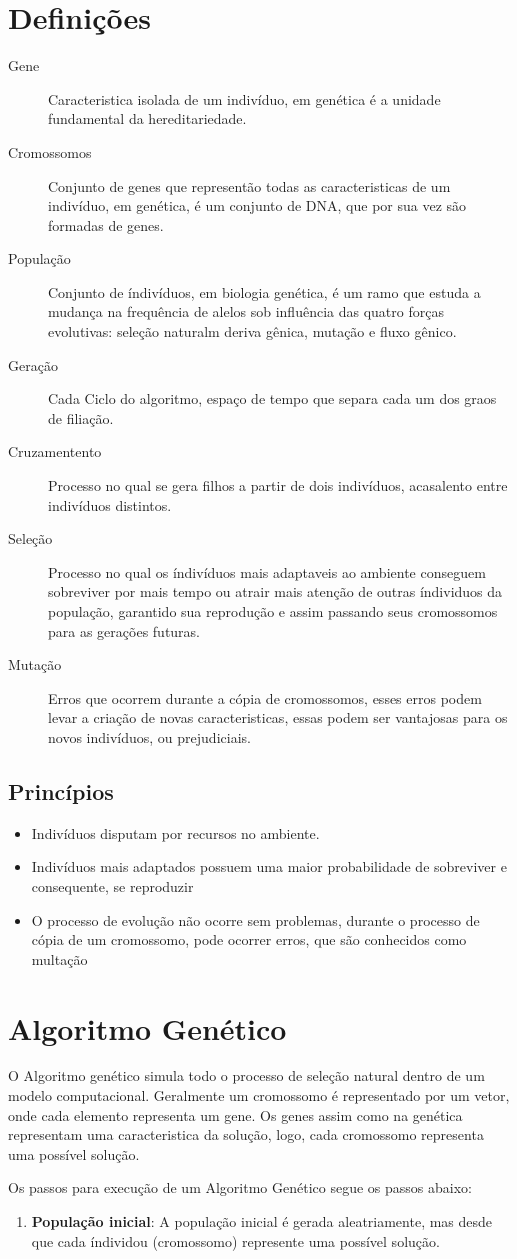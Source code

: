\documentclass[12pt,twoside,openright,a4paper,brazil]{article}
\begin{document}
	\section{Definições}
	\begin{description}
		\item[Gene] Caracteristica isolada de um indivíduo, em genética é a unidade fundamental da hereditariedade.
		\item[Cromossomos] Conjunto de genes que representão todas as caracteristicas de um indivíduo, em genética, é um conjunto de DNA, que por sua vez são formadas de genes.
		\item[População] Conjunto de índivíduos, em biologia genética, é um ramo que estuda a mudança na frequência de alelos sob influência das quatro forças evolutivas: seleção naturalm deriva gênica, mutação e fluxo gênico.
		\item[Geração] Cada Ciclo do algoritmo, espaço de tempo que separa cada um dos graos de filiação.
		\item[Cruzamentento] Processo no qual se gera filhos a partir de dois indivíduos, acasalento entre indivíduos distintos.
		\item[Seleção] Processo no qual os índivíduos mais adaptaveis ao ambiente conseguem sobreviver por mais tempo ou atrair mais atenção de outras índividuos da população, garantido sua reprodução e assim passando seus cromossomos para as gerações futuras.
		\item[Mutação] Erros que ocorrem durante a cópia de cromossomos, esses erros podem levar a criação de novas caracteristicas, essas podem ser vantajosas para os novos indivíduos, ou prejudiciais.
	\end{description}

	\subsection{Princípios}
		\begin{itemize}
		\item Indivíduos disputam por recursos no ambiente.
		\item Indivíduos mais adaptados possuem uma maior probabilidade de sobreviver e consequente, se reproduzir
		\item O processo de evolução não ocorre sem problemas, durante o processo de cópia de um cromossomo, pode ocorrer erros, que são conhecidos como multação
		\end{itemize}
		
	\section{Algoritmo Genético}
	O Algoritmo genético simula todo o processo de seleção natural dentro de um modelo computacional. Geralmente um cromossomo é representado por um vetor, onde cada elemento representa um gene. Os genes assim como na genética representam uma caracteristica da solução, logo, cada cromossomo representa uma possível solução.
	
	Os passos para execução de um Algoritmo Genético segue os passos abaixo:
	\begin{enumerate}
	\item \textbf{População inicial}: A população inicial é gerada aleatriamente, mas desde que cada índividou (cromossomo) represente uma possível solução. 
	\end{enumerate}
	
\end{document}

